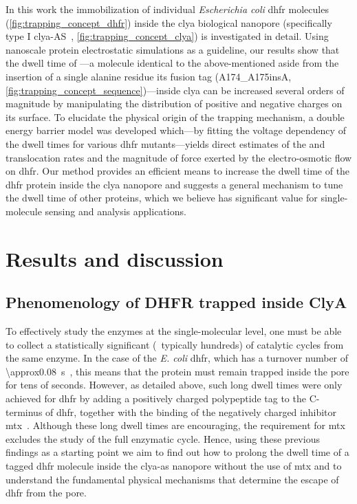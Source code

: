 In this work the immobilization of individual \textit{Escherichia coli} \gls{dhfr} molecules
(\cref{fig:trapping_concept_dhfr}) inside the \gls{clya} biological nanopore (specifically type I
\gls{clya}-AS~\cite{Soskine-2013}, \cref{fig:trapping_concept_clya}) is investigated in detail. Using
nanoscale protein electrostatic simulations as a guideline, our results show that the dwell time of
---a molecule identical to the above-mentioned \DHFRt{} aside from the insertion of a single
alanine residue its fusion tag (A174\_A175insA, \cref{fig:trapping_concept_sequence})---inside \gls{clya} can
be increased several orders of magnitude by manipulating the distribution of positive and negative charges on
its surface. To elucidate the physical origin of the trapping mechanism, a double energy barrier model was
developed which---by fitting the voltage dependency of the dwell times for various \gls{dhfr} mutants---yields
direct estimates of the \cisi{} and \transi{} translocation rates and the magnitude of force exerted by the
electro-osmotic flow on \gls{dhfr}\@. Our method provides an efficient means to increase the dwell time of the
\gls{dhfr} protein inside the \gls{clya} nanopore and suggests a general mechanism to tune the dwell time of
other proteins, which we believe has significant value for single-molecule sensing and analysis applications.


%
\section{Results and discussion}
%
\label{sec:trapping:results_discussion}
%

\subsection{Phenomenology of {DHFR} trapped inside {ClyA}}
%

To effectively study the enzymes at the single-molecular level, one must be able to collect a statistically
significant (\ie~typically hundreds) of catalytic cycles from the same enzyme. In the case of the \textit{E.
coli} \gls{dhfr}, which has a turnover number of \SI{\approx0.08}{\second}~\cite{Kohen-2015}, this means that
the protein must remain trapped inside the pore for tens of seconds. However, as detailed above, such long
dwell times were only achieved for \gls{dhfr} by adding a positively charged polypeptide tag to the C-terminus
of \gls{dhfr}, together with the binding of the negatively charged inhibitor
\gls{mtx}~\cite{Soskine-Biesemans-2015}. Although these long dwell times are encouraging, the requirement for
\gls{mtx} excludes the study of the full enzymatic cycle. Hence, using these previous findings as a starting
point we aim to find out how to prolong the dwell time of a tagged \gls{dhfr} molecule inside the
\gls{clya-as} nanopore without the use of \gls{mtx} and to understand the fundamental physical mechanisms that
determine the escape of \gls{dhfr} from the pore.

